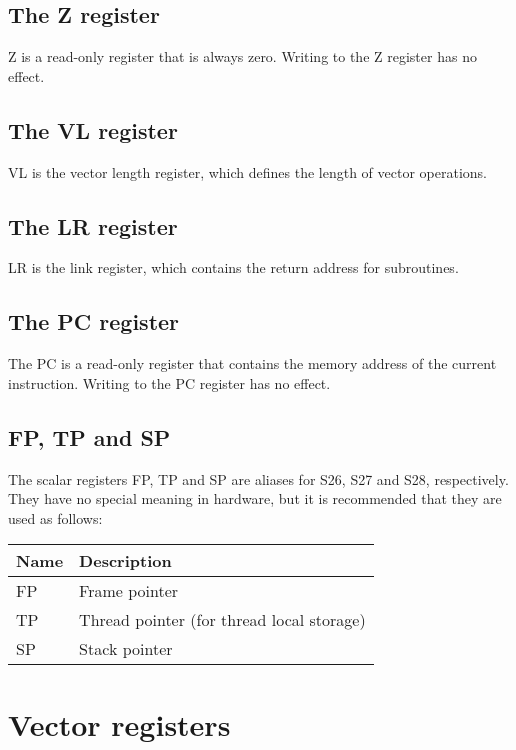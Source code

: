\subsection{The Z register}

Z is a read-only register that is always zero. Writing to the Z register has no
effect.

\subsection{The VL register}

VL is the vector length register, which defines the length of vector
operations.


\subsection{The LR register}

LR is the link register, which contains the return address for subroutines.

\subsection{The PC register}

The PC is a read-only register that contains the memory address of the current
instruction. Writing to the PC register has no effect.

\subsection{FP, TP and SP}

The scalar registers FP, TP and SP are aliases for S26, S27 and S28,
respectively. They have no special meaning in hardware, but it is recommended
that they are used as follows:

\begin{tabular}{|l|l|}
  \hline
  \textbf{Name} & \textbf{Description} \\
  \hline
  FP & Frame pointer \\
  \hline
  TP & Thread pointer (for thread local storage) \\
  \hline
  SP & Stack pointer \\
  \hline
\end{tabular}

\section{Vector registers}

